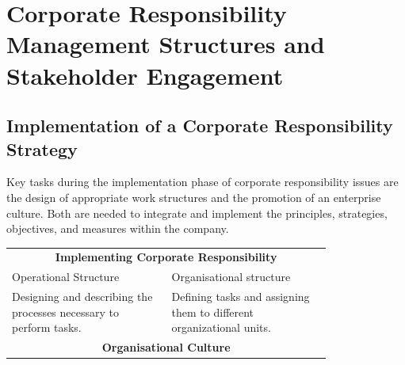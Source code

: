 \documentclass[11pt]{article}
\theoremstyle{definition}
\begin{document}
\section{Corporate Responsibility Management Structures and Stakeholder Engagement}
\subsection{Implementation of a Corporate Responsibility Strategy}
Key tasks during the implementation phase of corporate responsibility issues are the design of appropriate work structures and the promotion of an enterprise culture. Both are needed to integrate and implement the principles, strategies, objectives, and measures within the company.

\begin{tabularx}{\linewidth}{p{0.4\linewidth} p{0.4\linewidth}}
	\multicolumn{2}{c}{\textbf{Implementing Corporate Responsibility}}\\[1em]
	Operational Structure & Organisational structure \\[1em]
	Designing and describing the processes necessary to perform tasks. & Defining tasks and assigning them to different organizational units. \\[2em]
	\multicolumn{2}{c}{\textbf{Organisational Culture}}
\end{tabularx}
\end{document}
